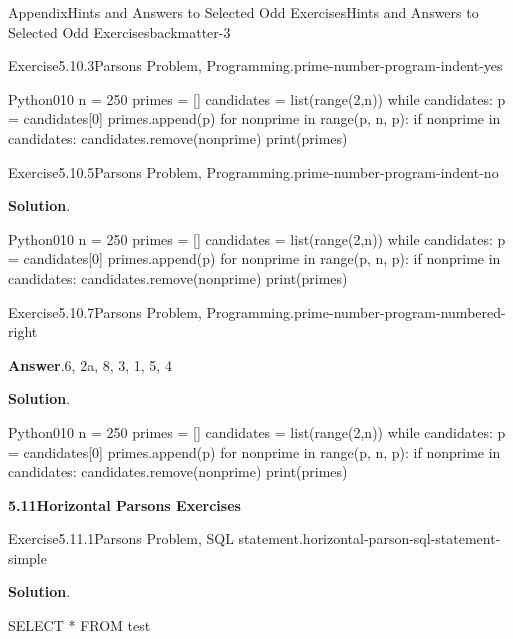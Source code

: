 \documentclass[oneside,10pt,]{book}
\newcommand{\blocktitlefont}{\relax}
\numberwithin{equation}{section}
\begin{document}
\begin{solutions-chapter}{Appendix}{Hints and Answers to Selected Odd Exercises}{}{Hints and Answers to Selected Odd Exercises}{}{}{backmatter-3}
\begin{divisionsolution}{Exercise}{5.10.3}{Parsons Problem, Programming.}{prime-number-program-indent-yes}
\begin{program}{Python}{0}{1}{0}
n = 250
primes = []
candidates = list(range(2,n))
while candidates:
    p = candidates[0]
    primes.append(p)
    for nonprime in range(p, n, p):
        if nonprime in candidates:
            candidates.remove(nonprime)
print(primes)
\end{program}
\end{divisionsolution}%
\begin{divisionsolution}{Exercise}{5.10.5}{Parsons Problem, Programming.}{prime-number-program-indent-no}%
\par\smallskip%
\noindent\textbf{\blocktitlefont Solution}.\hypertarget{prime-number-program-indent-no-5-back}{}\quad{}\begin{program}{Python}{0}{1}{0}
n = 250
primes = []
candidates = list(range(2,n))
while candidates:
    p = candidates[0]
    primes.append(p)
    for nonprime in range(p, n, p):
        if nonprime in candidates:
            candidates.remove(nonprime)
print(primes)
\end{program}
\end{divisionsolution}%
\begin{divisionsolution}{Exercise}{5.10.7}{Parsons Problem, Programming.}{prime-number-program-numbered-right}%
\par\smallskip%
\noindent\textbf{\blocktitlefont Answer}.\hypertarget{prime-number-program-numbered-right-5-back}{}\quad{}6, 2a, 8, 3, 1, 5, 4%
\par\smallskip%
\noindent\textbf{\blocktitlefont Solution}.\hypertarget{prime-number-program-numbered-right-6-back}{}\quad{}\begin{program}{Python}{0}{1}{0}
n = 250
primes = []
candidates = list(range(2,n))
while candidates:
    p = candidates[0]
    primes.append(p)
    for nonprime in range(p, n, p):
        if nonprime in candidates:
            candidates.remove(nonprime)
print(primes)
\end{program}
\end{divisionsolution}%
\par\medskip
\noindent\textbf{\Large{}5.11\space\textperiodcentered\space{}Horizontal Parsons Exercises}
\begin{divisionsolution}{Exercise}{5.11.1}{Parsons Problem, SQL statement.}{horizontal-parson-sql-statement-simple}%
\par\smallskip%
\noindent\textbf{\blocktitlefont Solution}.\hypertarget{horizontal-parson-sql-statement-simple-3-back}{}\quad{}%
\begin{codedisplay}
SELECT * FROM test
\end{codedisplay}

\end{divisionsolution}
\end{solutions-chapter}
\end{document}
